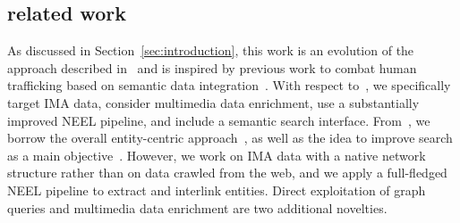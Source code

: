 \subsection{related work}

 


As discussed in Section~\ref{sec:introduction}, this work is an evolution of the approach described in~\cite{real_batini2021semantic} and is inspired by previous work to combat human trafficking based on semantic data integration~\cite{szekely2015building}. With respect to~\cite{real_batini2021semantic}, we specifically target IMA data, consider multimedia data enrichment, use a substantially improved NEEL pipeline, and include a semantic search interface. From~\cite{szekely2015building}, we borrow the overall entity-centric approach~\cite{kejriwal2018}, as well as the idea to improve search as a main objective~\cite{kejriwal2017investigative}. However, we work on IMA data with a native network structure rather than on data crawled from the web, and we apply a full-fledged NEEL pipeline to extract and interlink entities. Direct exploitation of graph queries and multimedia data enrichment are two additional novelties. %

